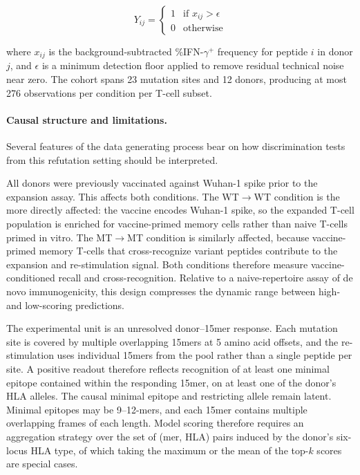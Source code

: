 \documentclass[11pt]{article}
\begin{document}
\begin{equation}
Y_{ij} =
\begin{cases}
1 & \text{if } x_{ij} > \epsilon \\
0 & \text{otherwise}
\end{cases}
\label{eq:binarize}
\end{equation}

where $x_{ij}$ is the background-subtracted \%IFN-$\gamma^+$
frequency for peptide $i$ in donor $j$, and $\epsilon$ is a minimum
detection floor applied to remove residual technical noise near zero.
The cohort spans 23 mutation sites and 12 donors, producing at most
276 observations per condition per T-cell subset.

\paragraph{Causal structure and limitations.}

Several features of the data generating process bear on how discrimination
tests from this refutation setting should be interpreted.

All donors were previously vaccinated against Wuhan-1 spike prior to
the expansion assay. This affects both conditions. The WT$\to$WT
condition is the more directly affected: the vaccine encodes Wuhan-1
spike, so the expanded T-cell population is enriched for
vaccine-primed memory cells rather than naive T-cells primed in vitro.
The MT$\to$MT condition is similarly affected, because vaccine-primed
memory T-cells that cross-recognize variant peptides contribute to the
expansion and re-stimulation signal. Both conditions therefore measure
vaccine-conditioned recall and cross-recognition. Relative to a naive-repertoire
assay of de novo immunogenicity, this design compresses the dynamic range
between high- and low-scoring predictions.

The experimental unit is an unresolved donor--15mer response. Each mutation
site is covered by multiple overlapping 15mers at 5
amino acid offsets, and the re-stimulation uses individual 15mers
from the pool rather than a single peptide per site. A positive
readout therefore reflects recognition of at least one minimal epitope
contained within the responding 15mer, on at least one of the donor's
HLA alleles. The causal minimal epitope and restricting allele remain latent.
Minimal epitopes may be
9--12-mers, and each 15mer contains multiple overlapping frames of
each length. Model scoring therefore requires an aggregation strategy
over the set of (mer, HLA) pairs induced by the donor's six-locus HLA
type, of which taking the maximum or the mean of the top-$k$ scores
are special cases.
\end{document}
